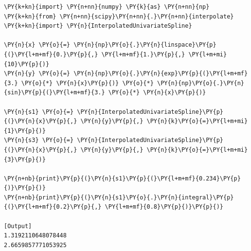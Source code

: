 \begin{Verbatim}[label=\makebox{\url{https://github.com/lucabaldini/cmepda/tree/master/slides/latex/snippets/spline.py}},commandchars=\\\{\}]
\PY{k+kn}{import} \PY{n+nn}{numpy} \PY{k}{as} \PY{n+nn}{np}
\PY{k+kn}{from} \PY{n+nn}{scipy}\PY{n+nn}{.}\PY{n+nn}{interpolate} \PY{k+kn}{import} \PY{n}{InterpolatedUnivariateSpline}

\PY{n}{x} \PY{o}{=} \PY{n}{np}\PY{o}{.}\PY{n}{linspace}\PY{p}{(}\PY{l+m+mf}{0.}\PY{p}{,} \PY{l+m+mf}{1.}\PY{p}{,} \PY{l+m+mi}{10}\PY{p}{)}
\PY{n}{y} \PY{o}{=} \PY{n}{np}\PY{o}{.}\PY{n}{exp}\PY{p}{(}\PY{l+m+mf}{3.} \PY{o}{*} \PY{n}{x}\PY{p}{)} \PY{o}{*} \PY{n}{np}\PY{o}{.}\PY{n}{sin}\PY{p}{(}\PY{l+m+mf}{3.} \PY{o}{*} \PY{n}{x}\PY{p}{)}

\PY{n}{s1} \PY{o}{=} \PY{n}{InterpolatedUnivariateSpline}\PY{p}{(}\PY{n}{x}\PY{p}{,} \PY{n}{y}\PY{p}{,} \PY{n}{k}\PY{o}{=}\PY{l+m+mi}{1}\PY{p}{)}
\PY{n}{s3} \PY{o}{=} \PY{n}{InterpolatedUnivariateSpline}\PY{p}{(}\PY{n}{x}\PY{p}{,} \PY{n}{y}\PY{p}{,} \PY{n}{k}\PY{o}{=}\PY{l+m+mi}{3}\PY{p}{)}

\PY{n+nb}{print}\PY{p}{(}\PY{n}{s1}\PY{p}{(}\PY{l+m+mf}{0.234}\PY{p}{)}\PY{p}{)}
\PY{n+nb}{print}\PY{p}{(}\PY{n}{s1}\PY{o}{.}\PY{n}{integral}\PY{p}{(}\PY{l+m+mf}{0.2}\PY{p}{,} \PY{l+m+mf}{0.8}\PY{p}{)}\PY{p}{)}

[Output]
1.3192110648078448
2.6659857771053925
\end{Verbatim}